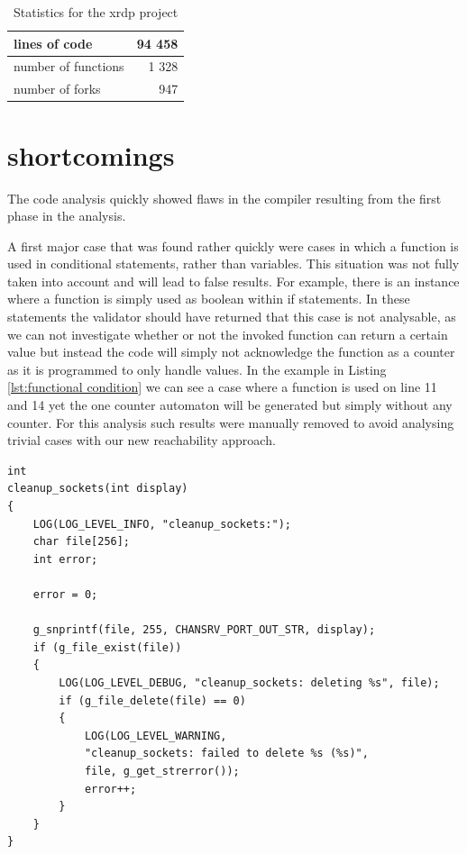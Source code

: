 \documentclass[12pt]{thesis}
\begin{document}
\begin{table}[h]
	\centering
	\begin{tabular}{ |p{4.5cm}|r|  }
		\hline
		lines of code & 94 458\\
		\hline
		number of functions   & 1 328\\
		\hline
		number of forks   & 947\\
		\hline
	\end{tabular}
	\caption{Statistics for the xrdp project}
\end{table}


\section{shortcomings}
The code analysis quickly showed flaws in the compiler resulting from the first phase in the analysis.

A first major case that was found rather quickly were cases in which a function is used in conditional statements, rather than variables. This situation was not fully taken into account and will lead to false results. For example, there is an instance where a function is simply used as boolean within if statements. In these statements the validator should have returned that this case is not analysable, as we can not investigate whether or not the invoked function can return a certain value but instead the code will simply not acknowledge the function as a counter as it is programmed to only handle values. In the example in Listing \ref{lst:functional condition} we can see a case where a function is used on line 11 and 14 yet the one counter automaton will be generated but simply without any counter. For this analysis such results were manually removed to avoid analysing trivial cases with our new reachability approach.

\begin{lstlisting}[style=CStyle,caption={Example of code using functions as conditional values}, label={lst:functional condition}]
int
cleanup_sockets(int display)
{
	LOG(LOG_LEVEL_INFO, "cleanup_sockets:");
	char file[256];
	int error;
	
	error = 0;
	
	g_snprintf(file, 255, CHANSRV_PORT_OUT_STR, display);
	if (g_file_exist(file))
	{
		LOG(LOG_LEVEL_DEBUG, "cleanup_sockets: deleting %s", file);
		if (g_file_delete(file) == 0)
		{
			LOG(LOG_LEVEL_WARNING,
			"cleanup_sockets: failed to delete %s (%s)",
			file, g_get_strerror());
			error++;
		}
	}
}
\end{lstlisting}
\end{document}
